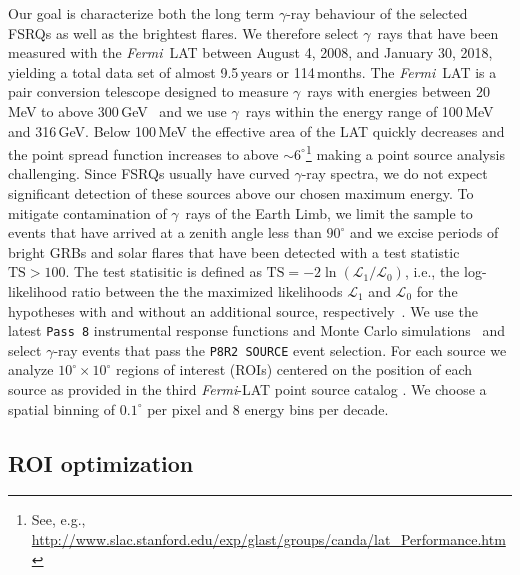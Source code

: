 \documentclass[twocolumn]{aastex62}
\newcommand{\Grays}{$\gamma$~rays\xspace}
\newcommand{\gray}{$\gamma$-ray\xspace}
\newcommand{\FermiLAT}{\emph{Fermi}~LAT\xspace}
\newcommand{\fermiLAT}{\emph{Fermi}-LAT\xspace}
\begin{document}
Our goal is characterize both the long term \gray behaviour of the selected FSRQs as well as the brightest flares.
We therefore select \Grays that have been measured with the \FermiLAT between August 4, 2008, and January 30, 2018, yielding a total data set of almost 9.5\,years or 114\,months.
The \FermiLAT is a pair conversion telescope designed to measure \Grays with energies between 20\,MeV to above 300\,GeV~\citep{2009ApJ...697.1071A} and we 
 use \Grays within the energy range of 100\,MeV and 316\,GeV. 
Below 100\,MeV the effective area of the LAT quickly decreases and the point spread function increases to above $\sim 6^\circ$\footnote{See, e.g., \url{http://www.slac.stanford.edu/exp/glast/groups/canda/lat_Performance.htm}} making a point source analysis challenging. 
Since FSRQs usually have curved \gray spectra, we do not expect significant detection of these sources above our chosen maximum energy.
To mitigate contamination of \Grays of the Earth Limb, we limit the sample to events that have arrived at a zenith angle less than $90^\circ$ and we excise periods of bright GRBs and solar flares that have been detected with a test statistic $\mathrm{TS} > 100$.
The test statisitic is defined as $\mathrm{TS} = -2\ln(\mathcal{L}_1 / \mathcal{L}_0)$, i.e., the log-likelihood ratio between the the maximized likelihoods $\mathcal{L}_1$ and $\mathcal{L}_0$ for the hypotheses with and without an additional source, respectively~\citep{mattox1996}.
We use the latest \texttt{Pass 8} instrumental response functions and Monte Carlo simulations~\citep{pass8} and select \gray events that pass the \texttt{P8R2 SOURCE} event selection. 
For each source we analyze $10^\circ \times 10^\circ$ regions of interest (ROIs) centered on the position of each source as provided in the third \fermiLAT point source catalog \citep[3FGL,][]{3fgl}.
We choose a spatial binning of $0.1^\circ$ per pixel and 8 energy bins per decade. 

\subsection{ROI optimization}
\label{sec:roi}
\end{document}
